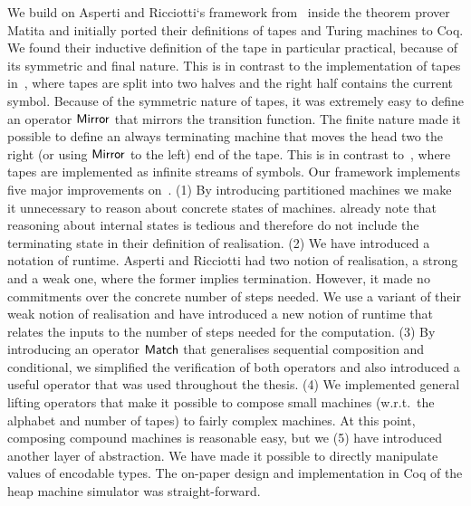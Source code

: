 We build on Asperti and Ricciotti`s framework from~\cite{asperti2015} inside the theorem prover Matita and initially ported their definitions of tapes
and Turing machines to Coq.  We found their inductive definition of the tape in particular practical, because of its symmetric and final nature.  This
is in contrast to the implementation of tapes in~\cite{Xu:2013:MTM:2529315.2529331}, where tapes are split into two halves and the right half contains
the current symbol.  Because of the symmetric nature of tapes, it was extremely easy to define an operator $\mathsf{Mirror}$ that mirrors the transition
function.  The finite nature made it possible to define an always terminating machine that moves the head two the right (or using $\mathsf{Mirror}$ to the
left) end of the tape.  This is in contrast to~\cite{Ciaffaglione:2016:TTC:2956213.2956306}, where tapes are implemented as infinite streams of
symbols.  Our framework implements five major improvements on~\cite{asperti2015}.  (1) By introducing partitioned machines we make it unnecessary to
reason about concrete states of machines.  \cite{asperti2015} already note that reasoning about internal states is tedious and therefore do not
include the terminating state in their definition of realisation.  (2) We have introduced a notation of runtime.  Asperti and Ricciotti had two notion
of realisation, a strong and a weak one, where the former implies termination.  However, it made no commitments over the concrete number of steps
needed.  We use a variant of their weak notion of realisation and have introduced a new notion of runtime that relates the inputs to the number of
steps needed for the computation.  (3) By introducing an operator $\mathsf{Match}$ that generalises sequential composition and conditional, we simplified
the verification of both operators and also introduced a useful operator that was used throughout the thesis.  (4) We implemented general lifting
operators that make it possible to compose small machines (w.r.t.\ the alphabet and number of tapes) to fairly complex machines.  At this point,
composing compound machines is reasonable easy, but we (5) have introduced another layer of abstraction.  We have made it possible to directly
manipulate values of encodable types.  The on-paper design and implementation in Coq of the heap machine simulator was straight-forward.

